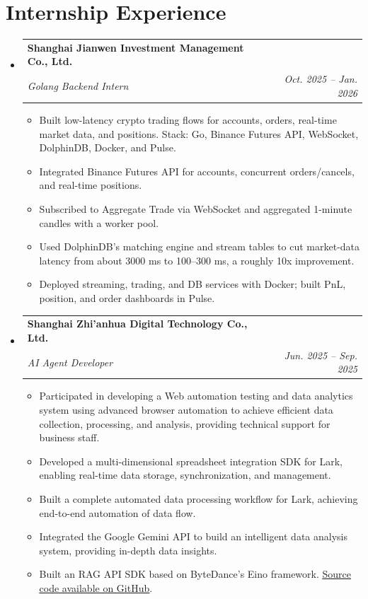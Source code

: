 \documentclass[letterpaper,10pt]{article}
\makeatletter
\newcommand{\resumeItem}[1]{
  \item\small{
    {#1 \vspace{-2pt}}
  }
}
\newcommand{\resumeSubheading}[4]{
  \vspace{-2pt}\item
    \begin{tabular*}{0.97\textwidth}[t]{l@{\extracolsep{\fill}}r}
      \textbf{#1} & #2 \\
      \textit{\small#3} & \textit{\small #4} \\
    \end{tabular*}\vspace{-7pt}
}
\newcommand{\resumeSubHeadingListStart}{\begin{itemize}[leftmargin=0.15in, label={}]}
\newcommand{\resumeSubHeadingListEnd}{\end{itemize}}
\newcommand{\resumeItemListStart}{\begin{itemize}}
\newcommand{\resumeItemListEnd}{\end{itemize}\vspace{-5pt}}
\makeatother
\begin{document}
\section{Internship Experience}
  \resumeSubHeadingListStart
    \resumeSubheading
      {Shanghai Jianwen Investment Management Co., Ltd.}{}
      {Golang Backend Intern}{Oct. 2025 -- Jan. 2026}
      \resumeItemListStart
        \resumeItem{Built low-latency crypto trading flows for accounts, orders, real-time market data, and positions. Stack: Go, Binance Futures API, WebSocket, DolphinDB, Docker, and Pulse.}
        \resumeItem{Integrated Binance Futures API for accounts, concurrent orders/cancels, and real-time positions.}
        \resumeItem{Subscribed to Aggregate Trade via WebSocket and aggregated 1-minute candles with a worker pool.}
        \resumeItem{Used DolphinDB's matching engine and stream tables to cut market-data latency from about 3000 ms to 100--300 ms, a roughly 10x improvement.}
        \resumeItem{Deployed streaming, trading, and DB services with Docker; built PnL, position, and order dashboards in Pulse.}
      \resumeItemListEnd
    \resumeSubheading
      {Shanghai Zhi'anhua Digital Technology Co., Ltd.}{}
      {AI Agent Developer}{Jun. 2025 -- Sep. 2025}
      \resumeItemListStart
        \resumeItem{Participated in developing a Web automation testing and data analytics system using advanced browser automation to achieve efficient data collection, processing, and analysis, providing technical support for business staff.}
        \resumeItem{Developed a multi-dimensional spreadsheet integration SDK for Lark, enabling real-time data storage, synchronization, and management.}
        \resumeItem{Built a complete automated data processing workflow for Lark, achieving end-to-end automation of data flow.}
        \resumeItem{Integrated the Google Gemini API to build an intelligent data analysis system, providing in-depth data insights.}
        \resumeItem{Built an RAG API SDK based on ByteDance's Eino framework. \href{https://github.com/leebrouse/EinoRag}{\underline{Source code available on GitHub}}.}
      \resumeItemListEnd
  \resumeSubHeadingListEnd


\end{document}
